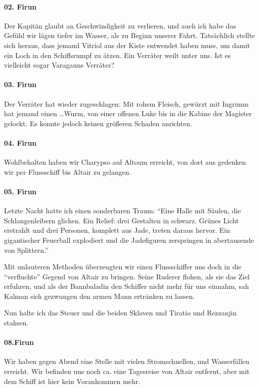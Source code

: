 \paragraph{02. Firun}
Der Kapitän glaubt an Geschwindigkeit zu verlieren, und auch ich habe das Gefühl wir lägen tiefer im Wasser, als zu Beginn unserer Fahrt.
Tatsächlich stellte sich heraus, dass jemand Vitriol aus der Kiste entwendet haben muss, um damit ein Loch in den Schiffsrumpf zu ätzen. Ein Verräter weilt unter uns. Ist es vielleicht sogar Varagauns Verräter?

\paragraph{03. Firun}
Der Verräter hat wieder zugeschlagen: Mit rohem Fleisch, gewürzt mit Ingrimm hat jemand einen \dots Wurm, von einer offenen Luke bis in die Kabine der Magister gelockt. Es konnte jedoch keinen größeren Schaden anrichten.

\paragraph{04. Firun}
Wohlbehalten haben wir Charypso auf Altoum erreicht, von dort aus gedenken wir per Flussschiff bis Altair zu gelangen.

\paragraph{05. Firun}
Letzte Nacht hatte ich einen sonderbaren Traum:
``Eine Halle mit Säulen, die Schlangenleibern glichen. Ein Relief: drei Gestalten in schwarz. Grünes Licht erstrahlt und drei Personen, komplett aus Jade, treten daraus hervor. Ein gigantischer Feuerball explodiert und die Jadefiguren zerspringen in abertausende von Splittern.''

Mit unlauteren Methoden überzeugten wir einen Flussschiffer uns doch in die ``verfluchte'' Gegend von Altair zu bringen. Seine Ruderer flohen, als sie das Ziel erfuhren, und als der Bannbaladin den Schiffer nicht mehr für uns einnahm, sah Kalman sich gezwungen den armen Mann ertränken zu lassen.

Nun halte ich das Steuer und die beiden Sklaven und Tiratio und Rezzanjin staksen.

\paragraph{08.Firun}
Wir haben gegen Abend eine Stelle mit vielen Stromschnellen, und Wasserfällen erreicht. Wir befinden uns noch ca. eine Tagesreise von Altair entfernt, aber mit dem Schiff ist hier kein Vorankommen mehr.

